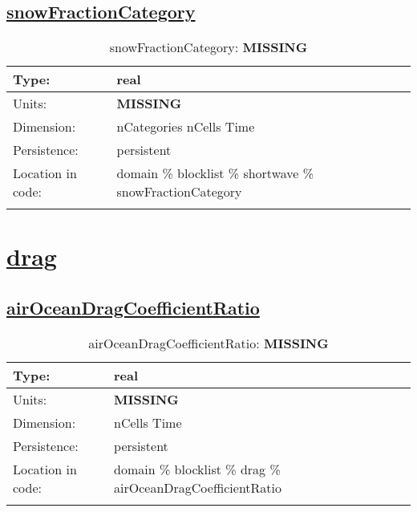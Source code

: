 \subsection[snowFractionCategory]{\hyperref[sec:var_tab_shortwave]{snowFractionCategory}}
\label{subsec:var_sec_shortwave_snowFractionCategory}
\begin{center}
\begin{longtable}{| p{2.0in} | p{4.0in} |}
        \hline 
        Type: & real \\
        \hline 
        Units: & {\bf \color{red} MISSING} \\
        \hline 
        Dimension: & nCategories nCells Time \\
        \hline 
        Persistence: & persistent \\
        \hline 
         Location in code: & domain \% blocklist \% shortwave \% snowFractionCategory \\
         \hline 
    \caption{snowFractionCategory: {\bf \color{red} MISSING}}
\end{longtable}
\end{center}
\section[drag]{\hyperref[sec:var_tab_drag]{drag}}
\label{sec:var_sec_drag}
\subsection[airOceanDragCoefficientRatio]{\hyperref[sec:var_tab_drag]{airOceanDragCoefficientRatio}}
\label{subsec:var_sec_drag_airOceanDragCoefficientRatio}
\begin{center}
\begin{longtable}{| p{2.0in} | p{4.0in} |}
        \hline 
        Type: & real \\
        \hline 
        Units: & {\bf \color{red} MISSING} \\
        \hline 
        Dimension: & nCells Time \\
        \hline 
        Persistence: & persistent \\
        \hline 
         Location in code: & domain \% blocklist \% drag \% airOceanDragCoefficientRatio \\
         \hline 
    \caption{airOceanDragCoefficientRatio: {\bf \color{red} MISSING}}
\end{longtable}
\end{center}
